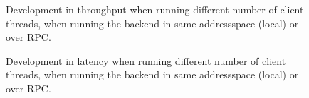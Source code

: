 \documentclass[11pt,a4paper,english]{article}
\begin{document}

\begin{figure}
  \centering
  \caption{Development in throughput when running different number of
    client threads, when running the backend in same addressspace (local) or
    over RPC.}
  \label{fig:throughput}
\end{figure}

\begin{figure}
  \centering
  \caption{Development in latency when running different number of
    client threads, when running the backend in same addressspace (local) or
    over RPC.}
  \label{fig:latency}
\end{figure}
\end{document}
